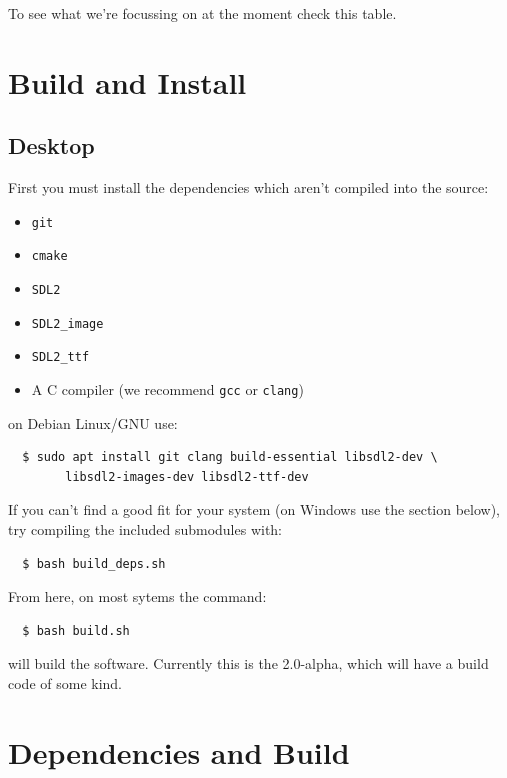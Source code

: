\documentclass[a4paper, 11pt]{report}
\begin{document}
To see what we're focussing on at the moment check this table.



\section{Build and Install}

\subsection{Desktop}

First you must install the dependencies which aren't compiled into the source:

\begin{itemize}
\item \texttt{git}
\item \texttt{cmake}
\item \texttt{SDL2}
\item \texttt{SDL2\_image}
\item \texttt{SDL2\_ttf}
\item A C compiler (we recommend \texttt{gcc} or \texttt{clang})
\end{itemize}

on Debian Linux/GNU use:

\begin{verbatim}
  $ sudo apt install git clang build-essential libsdl2-dev \
        libsdl2-images-dev libsdl2-ttf-dev
\end{verbatim}

If you can't find a good fit for your system (on Windows use the section below),
try compiling the included submodules with:

\begin{verbatim}
  $ bash build_deps.sh
\end{verbatim}

From here, on most sytems the command:

\begin{verbatim}
  $ bash build.sh
\end{verbatim}

will build the software. Currently this is the 2.0-alpha, which will have a build code of
some kind.

\section{Dependencies and Build}
\end{document}
